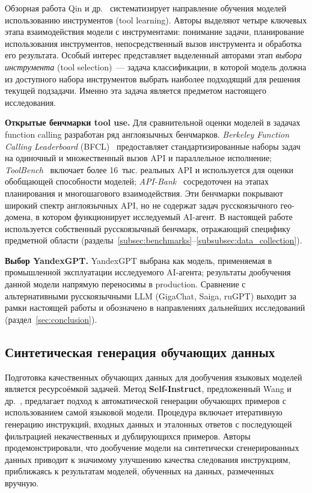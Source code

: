 Обзорная работа Qin и др.~\cite{qin2024toollearning} систематизирует направление обучения моделей использованию инструментов (tool learning). Авторы выделяют четыре ключевых этапа взаимодействия модели с инструментами: понимание задачи, планирование использования инструментов, непосредственный вызов инструмента и обработка его результата. Особый интерес представляет выделенный авторами этап \textit{выбора инструмента} (tool selection)~--- задача классификации, в которой модель должна из доступного набора инструментов выбрать наиболее подходящий для решения текущей подзадачи. Именно эта задача является предметом настоящего исследования.

\textbf{Открытые бенчмарки tool use.} Для сравнительной оценки моделей в задачах function calling разработан ряд англоязычных бенчмарков. \textit{Berkeley Function Calling Leaderboard} (BFCL)~\cite{bfcl2024} предоставляет стандартизированные наборы задач на одиночный и множественный вызов API и параллельное исполнение; \textit{ToolBench}~\cite{qin2023toolllm} включает более 16~тыс. реальных API и используется для оценки обобщающей способности моделей; \textit{API-Bank}~\cite{li2023apibank} сосредоточен на этапах планирования и многошагового взаимодействия. Эти бенчмарки покрывают широкий спектр англоязычных API, но не содержат задач русскоязычного гео-домена, в котором функционирует исследуемый AI-агент. В настоящей работе используется собственный русскоязычный бенчмарк, отражающий специфику предметной области (разделы~\ref{subsec:benchmarks}--\ref{subsubsec:data_collection}).

\textbf{Выбор YandexGPT.} YandexGPT выбрана как модель, применяемая в промышленной эксплуатации исследуемого AI-агента; результаты дообучения данной модели напрямую переносимы в production. Сравнение с альтернативными русскоязычными LLM (GigaChat, Saiga, ruGPT) выходит за рамки настоящей работы и обозначено в направлениях дальнейших исследований (раздел~\ref{sec:conclusion}).

\subsection{Синтетическая генерация обучающих данных}

Подготовка качественных обучающих данных для дообучения языковых моделей является ресурсоёмкой задачей. Метод \textbf{Self-Instruct}, предложенный Wang и др.~\cite{wang2023selfinstruct}, предлагает подход к автоматической генерации обучающих примеров с использованием самой языковой модели. Процедура включает итеративную генерацию инструкций, входных данных и эталонных ответов с последующей фильтрацией некачественных и дублирующихся примеров. Авторы продемонстрировали, что дообучение модели на синтетически сгенерированных данных приводит к значимому улучшению качества следования инструкциям, приближаясь к результатам моделей, обученных на данных, размеченных вручную.

